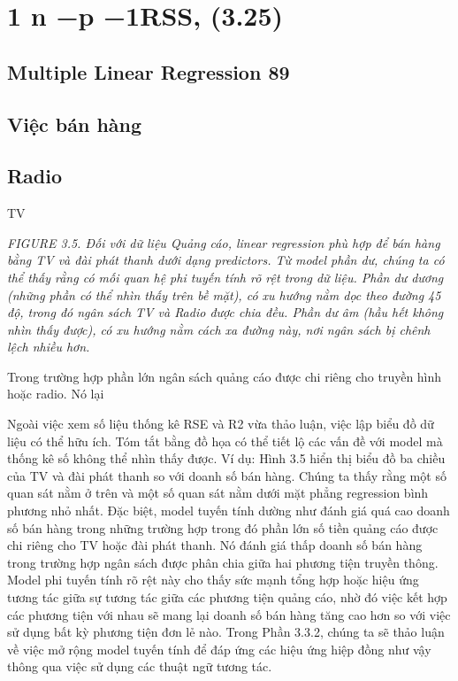 \section{1 n −p −1RSS, (3.25)}

\subsection{Multiple Linear Regression 89}

\subsection{Việc bán hàng}

\subsection{Radio}

TV

\noindent\textit{FIGURE 3.5. Đối với dữ liệu Quảng cáo, linear regression phù hợp để bán hàng bằng TV và đài phát thanh dưới dạng predictors. Từ model phần dư, chúng ta có thể thấy rằng có mối quan hệ phi tuyến tính rõ rệt trong dữ liệu. Phần dư dương (những phần có thể nhìn thấy trên bề mặt), có xu hướng nằm dọc theo đường 45 độ, trong đó ngân sách TV và Radio được chia đều. Phần dư âm (hầu hết không nhìn thấy được), có xu hướng nằm cách xa đường này, nơi ngân sách bị chênh lệch nhiều hơn.}

Trong trường hợp phần lớn ngân sách quảng cáo được chi riêng cho truyền hình hoặc radio. Nó lại

Ngoài việc xem số liệu thống kê RSE và R2 vừa thảo luận, việc lập biểu đồ dữ liệu có thể hữu ích. Tóm tắt bằng đồ họa có thể tiết lộ các vấn đề với model mà thống kê số không thể nhìn thấy được. Ví dụ: Hình 3.5 hiển thị biểu đồ ba chiều của TV và đài phát thanh so với doanh số bán hàng. Chúng ta thấy rằng một số quan sát nằm ở trên và một số quan sát nằm dưới mặt phẳng regression bình phương nhỏ nhất. Đặc biệt, model tuyến tính dường như đánh giá quá cao doanh số bán hàng trong những trường hợp trong đó phần lớn số tiền quảng cáo được chi riêng cho TV hoặc đài phát thanh. Nó đánh giá thấp doanh số bán hàng trong trường hợp ngân sách được phân chia giữa hai phương tiện truyền thông. Model phi tuyến tính rõ rệt này cho thấy sức mạnh tổng hợp hoặc hiệu ứng tương tác giữa sự tương tác giữa các phương tiện quảng cáo, nhờ đó việc kết hợp các phương tiện với nhau sẽ mang lại doanh số bán hàng tăng cao hơn so với việc sử dụng bất kỳ phương tiện đơn lẻ nào. Trong Phần 3.3.2, chúng ta sẽ thảo luận về việc mở rộng model tuyến tính để đáp ứng các hiệu ứng hiệp đồng như vậy thông qua việc sử dụng các thuật ngữ tương tác.


